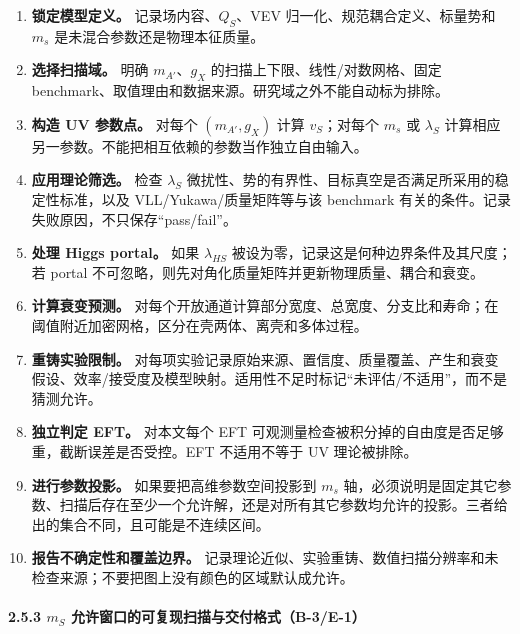 \documentclass[
  chinese,
  UTF8]{ctexart}
\providecommand{\tightlist}{%
  \setlength{\itemsep}{0pt}\setlength{\parskip}{0pt}}
\begin{document}
\begin{enumerate}
\def\labelenumi{\arabic{enumi}.}
\tightlist
\item
  \textbf{锁定模型定义。} 记录场内容、\(Q_S\)、VEV
  归一化、规范耦合定义、标量势和 \(m_s\) 是未混合参数还是物理本征质量。
\item
  \textbf{选择扫描域。} 明确 \(m_{A'}\)、\(g_X\)
  的扫描上下限、线性/对数网格、固定
  benchmark、取值理由和数据来源。研究域之外不能自动标为排除。
\item
  \textbf{构造 UV 参数点。} 对每个 \((m_{A'},g_X)\) 计算 \(v_S\)；对每个
  \(m_s\) 或 \(\lambda_S\)
  计算相应另一参数。不能把相互依赖的参数当作独立自由输入。
\item
  \textbf{应用理论筛选。} 检查 \(\lambda_S\)
  微扰性、势的有界性、目标真空是否满足所采用的稳定性标准，以及
  VLL/Yukawa/质量矩阵等与该 benchmark
  有关的条件。记录失败原因，不只保存``pass/fail''。
\item
  \textbf{处理 Higgs portal。} 如果 \(\lambda_{HS}\)
  被设为零，记录这是何种边界条件及其尺度；若 portal
  不可忽略，则先对角化质量矩阵并更新物理质量、耦合和衰变。
\item
  \textbf{计算衰变预测。}
  对每个开放通道计算部分宽度、总宽度、分支比和寿命；在阈值附近加密网格，区分在壳两体、离壳和多体过程。
\item
  \textbf{重铸实验限制。}
  对每项实验记录原始来源、置信度、质量覆盖、产生和衰变假设、效率/接受度及模型映射。适用性不足时标记``未评估/不适用''，而不是猜测允许。
\item
  \textbf{独立判定 EFT。} 对本文每个 EFT
  可观测量检查被积分掉的自由度是否足够重，截断误差是否受控。EFT
  不适用不等于 UV 理论被排除。
\item
  \textbf{进行参数投影。} 如果要把高维参数空间投影到 \(m_s\)
  轴，必须说明是固定其它参数、扫描后存在至少一个允许解，还是对所有其它参数均允许的投影。三者给出的集合不同，且可能是不连续区间。
\item
  \textbf{报告不确定性和覆盖边界。}
  记录理论近似、实验重铸、数值扫描分辨率和未检查来源；不要把图上没有颜色的区域默认成允许。
\end{enumerate}

\paragraph{\texorpdfstring{2.5.3 \(m_S\)
允许窗口的可复现扫描与交付格式（B-3/E-1）}{2.5.3 m\_S 允许窗口的可复现扫描与交付格式（B-3/E-1）}}\label{m_s-ux5141ux8bb8ux7a97ux53e3ux7684ux53efux590dux73b0ux626bux63cfux4e0eux4ea4ux4ed8ux683cux5f0fb-3e-1}
\end{document}
